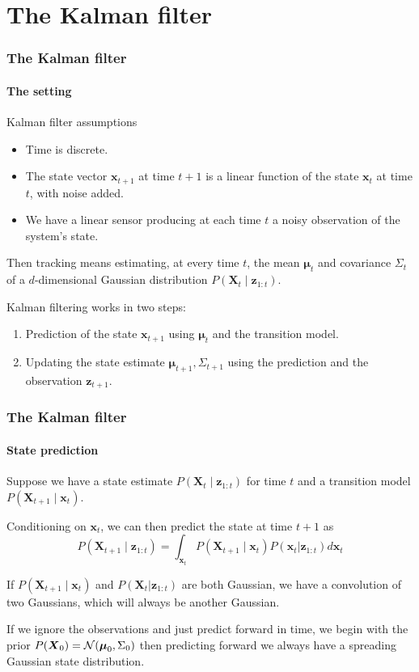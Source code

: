 \documentclass[aspectratio=169]{beamer}
\renewcommand{\vec}[1]{\boldsymbol{#1}}
\def\norm{\mbox{$\cal{N}$}}
\begin{document}
\section{The Kalman filter}

\begin{frame}
\frametitle{The Kalman filter}
\framesubtitle{The setting}

\begin{block}{Kalman filter assumptions}
\begin{itemize}
\item Time is \alert{discrete}.
\item The state vector $\vec{x}_{t+1}$ at time $t+1$ is a
  \alert{linear} function of the state $\vec{x}_t$ at time $t$, with
  noise added.
\item We have a linear \alert{sensor} producing at each time $t$ a
  noisy \alert{observation} of the system's state.
\end{itemize}
\end{block}

Then tracking means estimating, at every time $t$, the mean
$\vec{\mu}_t$ and covariance $\Sigma_t$ of a $d$-dimensional Gaussian
distribution $P(\vec{X}_t\mid \vec{z}_{1:t})$.

\medskip

Kalman filtering works in two steps:
\begin{enumerate}
\item \alert{Prediction} of the state $\vec{x}_{t+1}$ using
  $\vec{\mu}_t$ and the \alert{transition model}.
\item \alert{Updating} the state estimate $\vec{\mu}_{t+1},
  \Sigma_{t+1}$ using the prediction and the \alert{observation}
  $\vec{z}_{t+1}$.
\end{enumerate}
\end{frame}

\begin{frame}
\frametitle{The Kalman filter}
\framesubtitle{State prediction}

Suppose we have a state estimate $P(\vec{X}_t \mid \vec{z}_{1:t})$ for time
$t$ and a transition model $P(\vec{X}_{t+1} \mid \vec{x}_t)$.

\medskip
\alert{Conditioning} on $\vec{x}_t$,
we can then predict the state at time $t+1$ as
\[ P(\vec{X}_{t+1} \mid \vec{z}_{1:t}) = \int_{\vec{x}_t}
     P(\vec{X}_{t+1} \mid \vec{x}_t) P(\vec{x}_t|\vec{z}_{1:t})
     d\vec{x}_t \]

If $ P(\vec{X}_{t+1} \mid \vec{x}_t)$ and $P(\vec{X}_t|\vec{z}_{1:t})$
are both Gaussian, we have a convolution of two Gaussians, which will
always be another Gaussian.

\medskip
If we ignore the observations and just predict forward in time, we
begin with the prior $P(\vec{X}_0) =
\norm(\vec{\mu}_0,\Sigma_0)$ then predicting forward we
always have a spreading Gaussian state distribution.

\end{frame}
\end{document}

